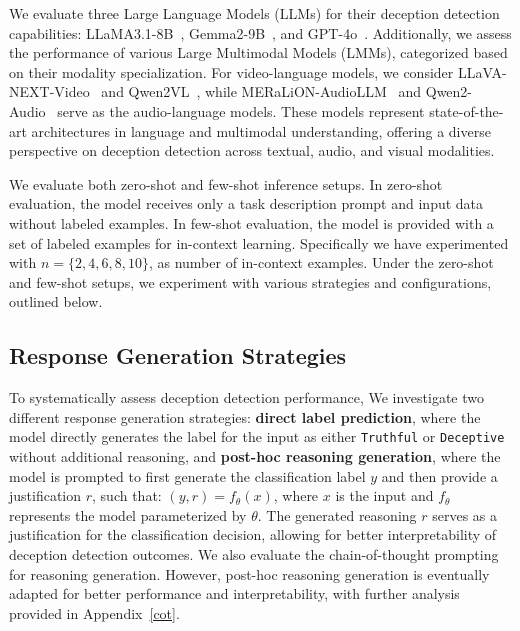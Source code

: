 We evaluate three Large Language Models (LLMs) for their deception detection capabilities: LLaMA3.1-8B~\cite{llama3.1}, Gemma2-9B~\cite{gemma2}, and GPT-4o~\cite{gpt4o}. Additionally, we assess the performance of various Large Multimodal Models (LMMs), categorized based on their modality specialization. For video-language models, we consider LLaVA-NEXT-Video~\cite{llavanextvideo} and Qwen2VL~\cite{qwen2vl}, while MERaLiON-AudioLLM~\cite{meralion} and Qwen2-Audio~\cite{qwen2audio} serve as the audio-language models. These models represent state-of-the-art architectures in language and multimodal understanding, offering a diverse perspective on deception detection across textual, audio, and visual modalities.

We evaluate both zero-shot and few-shot inference setups. In zero-shot evaluation, the model receives only a task description prompt and input data without labeled examples. In few-shot evaluation, the model is provided with a set of labeled examples for in-context learning. Specifically we have experimented with \( n = \{2, 4, 6, 8, 10\} \), as number of in-context examples. Under the zero-shot and few-shot setups, we experiment with various strategies and configurations, outlined below.

\subsection{Response Generation Strategies}
To systematically assess deception detection performance, We investigate two different response generation strategies: \textbf{direct label prediction}, where the model directly generates the label for the input as either \texttt{Truthful} or \texttt{Deceptive} without additional reasoning, and \textbf{post-hoc reasoning generation}, where the model is prompted to first generate the classification label \( y \) and then provide a justification \( r \), such that: \(
(y, r) = f_{\theta}(x) \),  where \( x \) is the input and \( f_{\theta} \) represents the model parameterized by \( \theta \). The generated reasoning \( r \) serves as a justification for the classification decision, allowing for better interpretability of deception detection outcomes. We also evaluate the chain-of-thought prompting for reasoning generation. However, post-hoc reasoning generation is eventually adapted for better performance and interpretability, with further analysis provided in Appendix~\ref{cot}.

